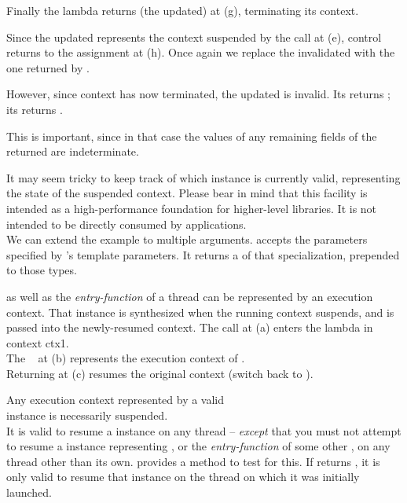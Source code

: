 Finally the lambda returns (the updated)  at (g), terminating its
context.

Since the updated  represents the context suspended by the call at
(e), control returns to the assignment at (h). Once again we replace the
invalidated  with the one returned by \op.

However, since context  has now terminated, the updated 
is invalid. Its \opbool returns ; its 
returns .

This is important, since in that case the values of any remaining fields of
the returned  are indeterminate.

It may seem tricky to keep track of which \ectx instance is currently
valid, representing the state of the suspended context. Please bear in
mind that this facility is intended as a high-performance foundation for
higher-level libraries. It is not intended to be directly consumed by
applications.\\
\newpage
We can extend the example to multiple arguments.
\op accepts the parameters specified by \ectx's template parameters. It
returns a  of that \ectx specialization, prepended to those
types.


\label{subsec:main}
\main as well as the \emph{entry-function} of a thread can be represented by an
execution context. That \ectx instance is synthesized when the running context
suspends, and is passed into the newly-resumed context.
The  call at (a) enters the lambda in context ctx1.\\
The \ectx\  at (b) represents the execution context of \main.\\
Returning  at (c) resumes the original context (switch back to
\main).


Any execution context represented by a valid\\
\ectx instance is necessarily suspended.\\
It is valid to resume a \ectx instance on any thread -- \emph{except} that you
must not attempt to resume a \ectx instance representing \main, or
the \emph{entry-function} of some other , on any thread other
than its own.
\ectx provides a method to test for this.
If  returns , it is
only valid to resume that
\ectx instance on the thread on which it was initially launched.



